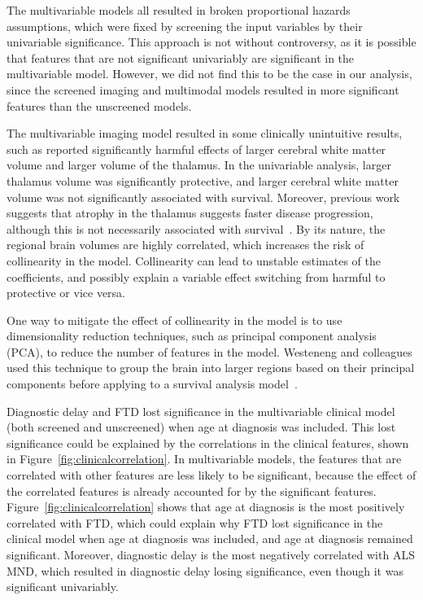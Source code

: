 The multivariable models all resulted in broken proportional hazards assumptions, which were fixed by screening the input variables by their univariable significance.
This approach is not without controversy, as it is possible that features that are not significant univariably are significant in the multivariable model.
However, we did not find this to be the case in our analysis, since the screened imaging and multimodal models resulted in more significant features than the unscreened models.

The multivariable imaging model resulted in some clinically unintuitive results, such as reported significantly harmful effects of larger cerebral white matter volume and larger volume of the thalamus.
In the univariable analysis, larger thalamus volume was significantly protective, and larger cerebral white matter volume was not significantly associated with survival.
Moreover, previous work suggests that atrophy in the thalamus suggests faster disease progression, although this is not necessarily associated with survival~\cite{sendaStructuralMRICorrelates2017,dieckmannCorticalSubcorticalGrey2022}.
By its nature, the regional brain volumes are highly correlated, which increases the risk of collinearity in the model.
Collinearity can lead to unstable estimates of the coefficients, and possibly explain a variable effect switching from harmful to protective or vice versa.

One way to mitigate the effect of collinearity in the model is to use dimensionality reduction techniques, such as principal component analysis (PCA), to reduce the number of features in the model.
Westeneng and colleagues used this technique to group the brain into larger regions based on their principal components before applying to a survival analysis model~\cite{westenengSubcorticalStructuresAmyotrophic2015}.

Diagnostic delay and FTD lost significance in the multivariable clinical model (both screened and unscreened) when age at diagnosis was included.
This lost significance could be explained by the correlations in the clinical features, shown in Figure~\ref{fig:clinicalcorrelation}.
In multivariable models, the features that are correlated with other features are less likely to be significant, because the effect of the correlated features is already accounted for by the significant features.
Figure~\ref{fig:clinicalcorrelation} shows that age at diagnosis is the most positively correlated with FTD, which could explain why FTD lost significance in the clinical model when age at diagnosis was included, and age at diagnosis remained significant.
Moreover, diagnostic delay is the most negatively correlated with ALS MND, which resulted in diagnostic delay losing significance, even though it was significant univariably.

